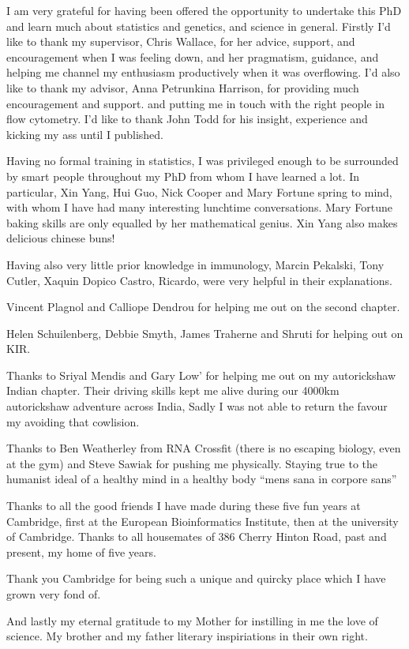 
\begin{acknowledgements}      

I am very grateful for having been offered the opportunity to undertake this PhD and learn much about statistics and genetics,
and science in general.
Firstly I'd like to thank my supervisor, Chris Wallace, for her advice, support,
and encouragement when I was feeling down,
and her pragmatism, guidance,
and helping me channel my enthusiasm productively when it was overflowing.
I'd also like to thank my advisor, Anna Petrunkina Harrison, for providing much encouragement and support.
and putting me in touch with the right people in flow cytometry.
I'd like to thank John Todd for his insight, experience and kicking my ass until I published.

Having no formal training in statistics,
I was privileged enough to be surrounded by smart people throughout my PhD from whom I have learned a lot.
In particular, Xin Yang, Hui Guo, Nick Cooper and Mary Fortune spring to mind, with whom I have had many interesting lunchtime conversations.
Mary Fortune baking skills are only equalled by her mathematical genius.
Xin Yang also makes delicious chinese buns!

Having also very little prior knowledge in immunology, Marcin Pekalski, Tony Cutler, Xaquin Dopico Castro, Ricardo, were very helpful in their explanations.

Vincent Plagnol and Calliope Dendrou for helping me out on the second chapter.

Helen Schuilenberg, Debbie Smyth, James Traherne and Shruti for helping out on KIR.

Thanks to Sriyal Mendis and Gary Low' for helping me out on my autorickshaw Indian chapter.
Their driving skills kept me alive during our 4000km autorickshaw adventure across India,
Sadly I was not able to return the favour my avoiding that cowlision.

Thanks to Ben Weatherley from RNA Crossfit (there is no escaping biology, even at the gym) and Steve Sawiak for pushing me physically.
Staying true to the humanist ideal of a healthy mind in a healthy body ``mens sana in corpore sans''

Thanks to all the good friends I have made during these five fun years at Cambridge, first at the European Bioinformatics Institute,
then at the university of Cambridge.
Thanks to all housemates of 386 Cherry Hinton Road, past and present, my home of five years.

Thank you Cambridge for being such a unique and quircky place which I have grown very fond of.

And lastly my eternal gratitude to my Mother for instilling in me the love of science.
My brother and my father literary inspiriations in their own right.


\end{acknowledgements}
